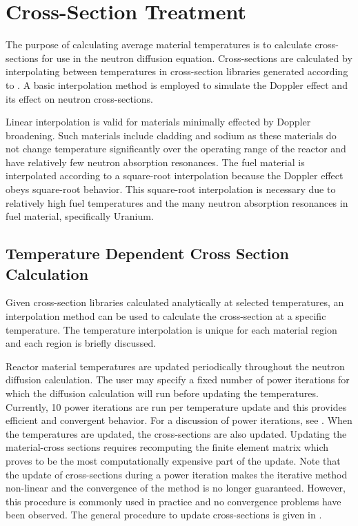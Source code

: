 \section{Cross-Section Treatment}
  The purpose of calculating average material temperatures is to calculate
  cross-sections for use in the neutron diffusion equation. Cross-sections are
  calculated by interpolating between temperatures in cross-section libraries
  generated according to . A basic
  interpolation method is employed to simulate the Doppler effect and its effect
  on neutron cross-sections.

  Linear interpolation is valid for materials minimally effected by Doppler 
  broadening. Such materials include cladding and sodium as these materials do 
  not change temperature significantly over the operating range of the reactor 
  and have relatively few neutron absorption resonances. The fuel material is 
  interpolated according to a square-root interpolation because the Doppler 
  effect obeys square-root behavior. This square-root interpolation is necessary
  due to relatively high fuel temperatures and the many neutron absorption 
  resonances in fuel material, specifically Uranium.

  \subsection{Temperature Dependent Cross Section Calculation}
    Given cross-section libraries calculated analytically at selected 
    temperatures, an interpolation method can be used to calculate the 
    cross-section at a specific temperature.  The temperature interpolation is 
    unique for each material region and each region is briefly discussed.

    Reactor material temperatures are updated periodically throughout the 
    neutron diffusion calculation. The user may specify a fixed number of power
    iterations for which the diffusion calculation will run before updating the
    temperatures. Currently, 10 power iterations are run per temperature update
    and this provides efficient and convergent behavior.
    For a discussion of power iterations, see . When
    the temperatures are updated, the cross-sections are also updated. Updating
    the material-cross sections requires recomputing the finite element matrix
    which proves to be the most computationally expensive part of the update. 
    Note that the update of cross-sections during a power iteration makes the
    iterative method non-linear and the convergence of the method is no longer
    guaranteed. However, this procedure is commonly used in practice and no 
    convergence problems have been observed. The general procedure to update
    cross-sections is given in .

